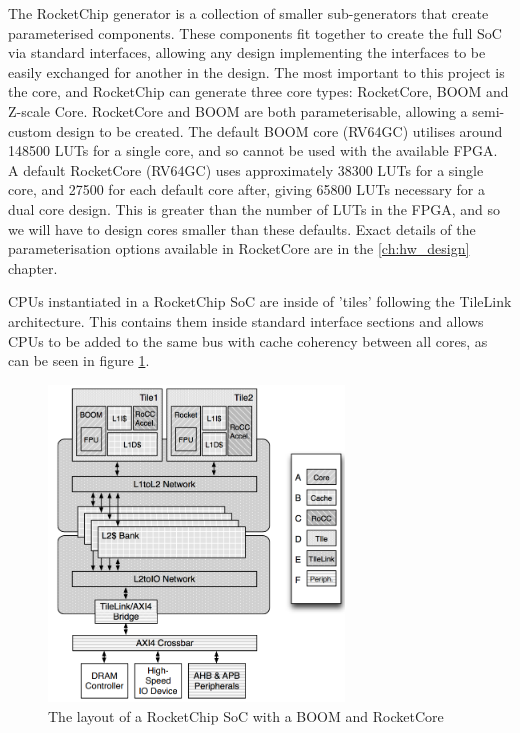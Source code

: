 The RocketChip generator is a collection of smaller sub-generators that create parameterised components. These components fit together to create the full SoC via standard interfaces, allowing any design implementing the interfaces to be easily exchanged for another in the design. The most important to this project is the core, and RocketChip can generate three core types: RocketCore, BOOM\cite{boom-core} and Z-scale Core. RocketCore and BOOM are both parameterisable, allowing a semi-custom design to be created. The default BOOM core (RV64GC) utilises around 148500 LUTs for a single core, and so cannot be used with the available FPGA. A default RocketCore (RV64GC) uses approximately 38300 LUTs for a single core, and 27500 for each default core after, giving 65800 LUTs necessary for a dual core design. This is greater than the number of LUTs in the FPGA, and so we will have to design cores smaller than these defaults. Exact details of the parameterisation options available in RocketCore are in the \ref{ch:hw_design} chapter.

CPUs instantiated in a RocketChip SoC are inside of 'tiles' following the TileLink architecture\cite{tilelink}. This contains them inside standard interface sections and allows CPUs to be added to the same bus with cache coherency between all cores, as can be seen in figure \ref{fig:rocketchip_example}.

\begin{figure}[h!]
    \centering
    \includegraphics[width=0.7\textwidth]{img/rocketchip_soc.png}
    \caption{The layout of a RocketChip SoC with a BOOM and RocketCore\cite{rocketchip}}
    \label{fig:rocketchip_example}
\end{figure}

